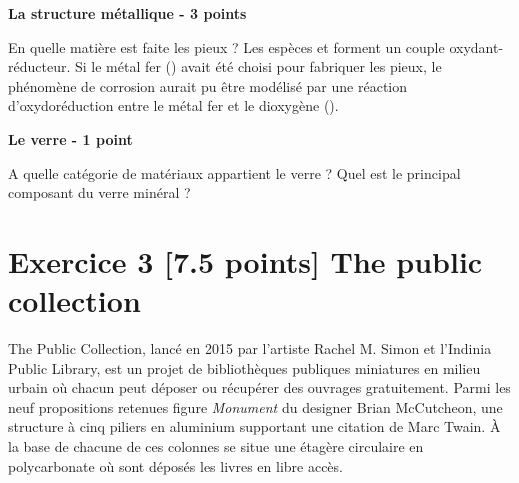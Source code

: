 \documentclass{exam}
\begin{document}
\vspace{1em}
\textbf{La structure métallique - 3 points}

\begin{questions}
  \question[0.5] En quelle matière est faite les pieux ?
  \question[2.5] Les espèces  et  forment un couple oxydant-réducteur. Si le métal fer () avait été choisi pour fabriquer les pieux, le phénomène de corrosion aurait pu être modélisé par une réaction d'oxydoréduction entre le métal fer et le dioxygène ().
\end{questions}

\vspace{1em}
\textbf{Le verre - 1 point}

\begin{questions}
  \question[0.5] A quelle catégorie de matériaux appartient le verre ? 
  \question[0.5] Quel est le principal composant du verre minéral ?
\end{questions}

\section*{Exercice 3 [7.5 points] The public collection}

\begin{tcolorbox}[colback=white, colframe=gray, coltitle=black, title=\textbf{Document 1 - Introduction}]
  The Public Collection, lancé en 2015 par l'artiste Rachel M. Simon et l'Indinia Public Library, est un projet de bibliothèques publiques miniatures en milieu urbain où chacun peut déposer ou récupérer des ouvrages gratuitement.
  Parmi les neuf propositions retenues figure \textit{Monument} du designer Brian McCutcheon, une structure à cinq piliers en aluminium supportant une citation de Marc Twain.
  À la base de chacune de ces colonnes se situe une étagère circulaire en polycarbonate où sont déposés les livres en libre accès.
\end{tcolorbox}
\end{document}
